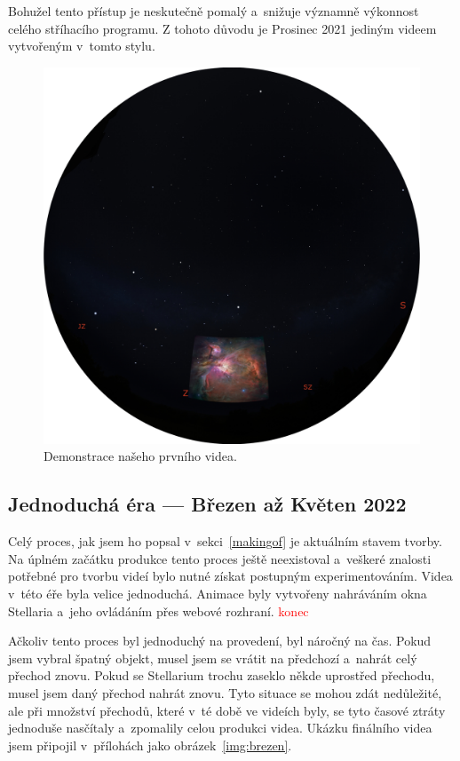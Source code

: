 \documentclass[12pt,a4paper,titlepage]{article}
\begin{document}
Bohužel tento přístup je neskutečně pomalý a~snižuje významně výkonnost celého stříhacího programu. Z tohoto důvodu je Prosinec 2021 jediným videem vytvořeným v~tomto stylu.

\begin{figure}[ht]
	\centering
	\includegraphics[width=.7\textwidth]{prosinec.eps}
	\caption{Demonstrace našeho prvního videa.}\label{img:prosinec}
\end{figure}
\subsection{Jednoduchá éra --- Březen až Květen 2022}
Celý proces, jak jsem ho popsal v~sekci~\ref{makingof} je aktuálním stavem tvorby. Na úplném začátku produkce tento proces ještě neexistoval a~veškeré znalosti potřebné pro tvorbu  videí bylo nutné získat postupným experimentováním. Videa v~této éře byla velice jednoduchá. Animace byly vytvořeny nahráváním okna Stellaria a~jeho ovládáním přes webové rozhraní. \textcolor{red}{konec}

Ačkoliv tento proces byl jednoduchý na provedení, byl náročný na čas. Pokud jsem vybral špatný objekt, musel jsem se vrátit na předchozí a~nahrát celý přechod znovu. Pokud se Stellarium trochu zaseklo někde uprostřed přechodu, musel jsem daný přechod nahrát znovu. Tyto situace se mohou zdát nedůležité, ale při množství přechodů, které v~té době ve videích byly, se tyto časové ztráty jednoduše nasčítaly a~zpomalily celou produkci videa. Ukázku finálního videa jsem připojil v~přílohách jako obrázek~\ref{img:brezen}.
\end{document}
